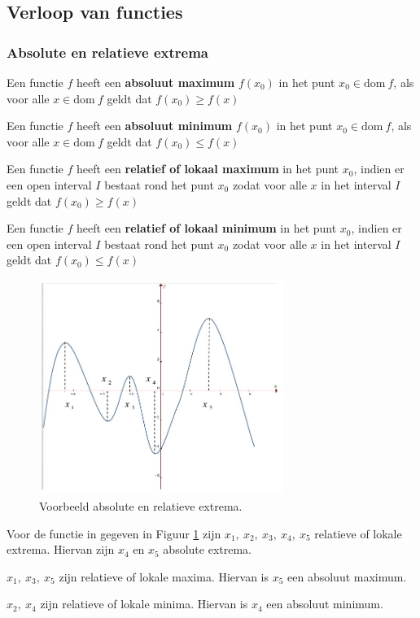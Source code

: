 \subsection{Verloop van functies}

\subsubsection{Absolute en relatieve extrema}


\begin{definitie}
	Een functie $f$ heeft een \textbf{absoluut maximum} $f(x_{0})$
in het punt $x_{0}\in\textrm{dom}\:f$, als voor alle $x\in\textrm{dom}\:f$
geldt dat $f(x_{0})\geqslant f(x)$

Een functie $f$ heeft een \textbf{absoluut minimum} $f(x_{0})$
in het punt $x_{0}\in\textrm{dom}\:f$, als voor alle $x\in\textrm{dom}\:f$
geldt dat $f(x_{0})\leqslant f(x)$

Een functie $f$ heeft een \textbf{relatief of lokaal maximum}
in het punt $x_{0}$, indien er een open interval $I$ bestaat rond
het punt $x_{0}$ zodat voor alle $x$ in het interval $I$ geldt
dat $f(x_{0})\geqslant f(x)$

Een functie $f$ heeft een \textbf{relatief of lokaal minimum}
in het punt $x_{0}$, indien er een open interval $I$ bestaat rond
het punt $x_{0}$ zodat voor alle $x$ in het interval $I$ geldt
dat $f(x_{0})\leqslant f(x)$

\end{definitie}


\begin{voorbeeld}
	\begin{figure}[h]
\centering{}\includegraphics[height=7cm]{2_elem_rekenvaardigheden_B/inputs/verloop_vb1.jpg} 
\caption{Voorbeeld absolute en relatieve extrema.}
\label{fig:vb1}
\end{figure}


Voor de functie in gegeven in Figuur \ref{fig:vb1} zijn $x_{1},\:x_{2},\:x_{3},\:x_{4},\:x_{5}$ relatieve
of lokale extrema. Hiervan zijn $x_{4}$ en $x_{5}$ absolute extrema.

$x_{1},\:x_{3},\:x_{5}$ zijn relatieve of lokale maxima.
Hiervan is $x_{5}$ een absoluut maximum.

$x_{2},\:x_{4}$ zijn relatieve of lokale minima. Hiervan
is $x_{4}$ een absoluut minimum.

\end{voorbeeld}

